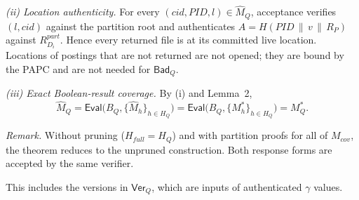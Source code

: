 
\emph{(ii) Location authenticity.} For every $(cid,PID,l) \in \hat{M}_Q$, acceptance verifies $(l,cid)$
against the partition root and authenticates $A = H(PID \,\|\, v \,\|\, R_P)$ against $R^{part}_{D_i}$.
Hence every returned file is at its committed live location. Locations of postings that are not
returned are not opened; they are bound by the PAPC and are not needed for $\mathsf{Bad}_Q$.


\emph{(iii) Exact Boolean-result coverage.} By (i) and Lemma~2,
\begin{equation}
\hat{M}_Q = \mathsf{Eval}\big(B_Q, \{\hat{M}_h\}_{h \in H_Q}\big)
          = \mathsf{Eval}\big(B_Q, \{M_h^{*}\}_{h \in H_Q}\big) = M_Q^{*} .
\end{equation}


\emph{Remark.} Without pruning ($H_{full} = H_Q$) and with partition proofs for all of $M_{cov}$, the
theorem reduces to the unpruned construction. Both response forms are accepted by the same verifier.



This includes the versions in $\mathsf{Ver}_Q$, which are inputs of authenticated $\gamma$ values.




